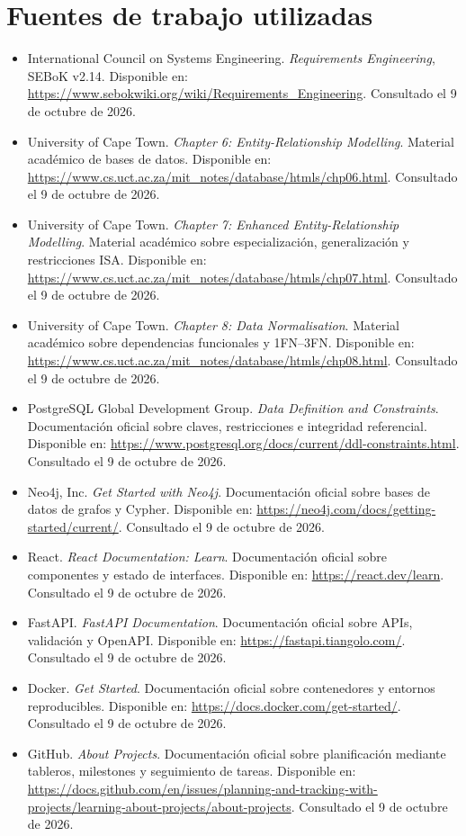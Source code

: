 \documentclass[12pt,a4paper]{article}
\begin{document}
\section*{Fuentes de trabajo utilizadas}
\begin{itemize}
\item International Council on Systems Engineering. \textit{Requirements Engineering}, SEBoK v2.14. Disponible en: \url{https://www.sebokwiki.org/wiki/Requirements_Engineering}. Consultado el 9 de octubre de 2026.
\item University of Cape Town. \textit{Chapter 6: Entity-Relationship Modelling}. Material académico de bases de datos. Disponible en: \url{https://www.cs.uct.ac.za/mit_notes/database/htmls/chp06.html}. Consultado el 9 de octubre de 2026.
\item University of Cape Town. \textit{Chapter 7: Enhanced Entity-Relationship Modelling}. Material académico sobre especialización, generalización y restricciones ISA. Disponible en: \url{https://www.cs.uct.ac.za/mit_notes/database/htmls/chp07.html}. Consultado el 9 de octubre de 2026.
\item University of Cape Town. \textit{Chapter 8: Data Normalisation}. Material académico sobre dependencias funcionales y 1FN--3FN. Disponible en: \url{https://www.cs.uct.ac.za/mit_notes/database/htmls/chp08.html}. Consultado el 9 de octubre de 2026.
\item PostgreSQL Global Development Group. \textit{Data Definition and Constraints}. Documentación oficial sobre claves, restricciones e integridad referencial. Disponible en: \url{https://www.postgresql.org/docs/current/ddl-constraints.html}. Consultado el 9 de octubre de 2026.
\item Neo4j, Inc. \textit{Get Started with Neo4j}. Documentación oficial sobre bases de datos de grafos y Cypher. Disponible en: \url{https://neo4j.com/docs/getting-started/current/}. Consultado el 9 de octubre de 2026.
\item React. \textit{React Documentation: Learn}. Documentación oficial sobre componentes y estado de interfaces. Disponible en: \url{https://react.dev/learn}. Consultado el 9 de octubre de 2026.
\item FastAPI. \textit{FastAPI Documentation}. Documentación oficial sobre APIs, validación y OpenAPI. Disponible en: \url{https://fastapi.tiangolo.com/}. Consultado el 9 de octubre de 2026.
\item Docker. \textit{Get Started}. Documentación oficial sobre contenedores y entornos reproducibles. Disponible en: \url{https://docs.docker.com/get-started/}. Consultado el 9 de octubre de 2026.
\item GitHub. \textit{About Projects}. Documentación oficial sobre planificación mediante tableros, milestones y seguimiento de tareas. Disponible en: \url{https://docs.github.com/en/issues/planning-and-tracking-with-projects/learning-about-projects/about-projects}. Consultado el 9 de octubre de 2026.
\end{itemize}
\end{document}
